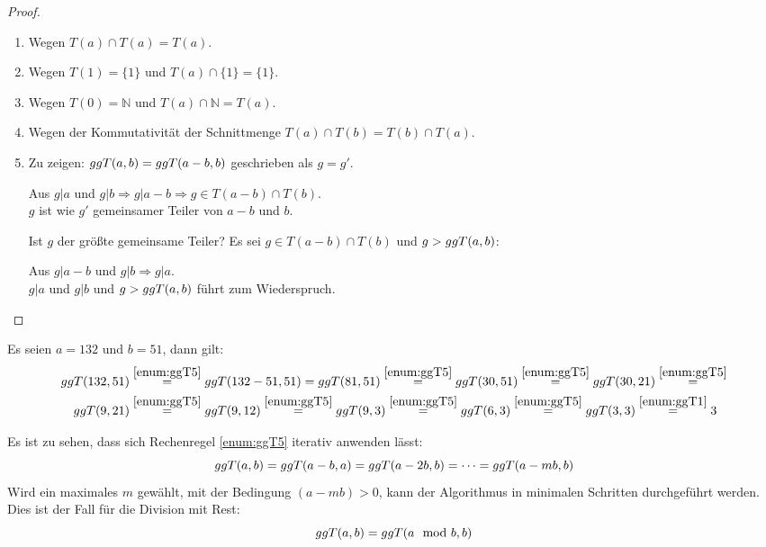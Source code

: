 \begin{proof}\mbox{}
  \begin{enumerate}
    \item Wegen $T(a) \cap T(a) = T(a)$.
    \item Wegen $T(1) = \{1\}$ und $T(a) \cap \{1\} = \{1\}$.
    \item Wegen $T(0) = \mathbb{N}$ und $T(a) \cap \mathbb{N} = T(a)$.
    \item Wegen der Kommutativität der Schnittmenge $T(a) \cap T(b) = T(b)\cap T(a)$.\newpage
    \item Zu zeigen: $ggT(a,b) = ggT(a - b,b)$ geschrieben als $g = g'$.
          \begin{center}
            Aus $ g|a$ und $g|b \Rightarrow g|a-b \Rightarrow g \in T(a-b) \cap T(b)$.\\
            $g$ ist wie $g'$ gemeinsamer Teiler von $a-b$ und $b$.
          \end{center}
          Ist $g$ der größte gemeinsame Teiler?
          Es sei $g \in T(a-b) \cap T(b)$ und $g > ggT(a,b)$:
          \begin{center}
            Aus $g|a-b$ und $g|b \Rightarrow g|a$.\\
            $g|a$ und $g|b$ und $g > ggT(a,b)$ führt zum Wiederspruch.
          \end{center}
  \end{enumerate}
\end{proof}

\begin{example}
  Es seien $a=132$ und $b=51$, dann gilt:
  \begin{align*}
    ggT(132,51) & \stackrel{\ref{enum:ggT5}}{=} ggT(132 - 51,51) =
    ggT(81,51) \stackrel{\ref{enum:ggT5}}{=} ggT(30,51) \stackrel{\ref{enum:ggT5}}{=}
    ggT(30,21) \stackrel{\ref{enum:ggT5}}{=}                                        \\
    ggT(9,21)   & \stackrel{\ref{enum:ggT5}}{=} ggT(9,12) \stackrel{\ref{enum:ggT5}}{=}
    ggT(9,3) \stackrel{\ref{enum:ggT5}}{=} ggT(6,3) \stackrel{\ref{enum:ggT5}}{=}
    ggT(3,3) \stackrel{\ref{enum:ggT1}}{=} 3
  \end{align*}
\end{example}

\noindent
Es ist zu sehen, dass sich Rechenregel \ref{enum:ggT5} iterativ anwenden lässt:
\begin{equation*}
  ggT(a,b) = ggT(a-b,a) = ggT(a-2b,b) = \dots = ggT(a-mb,b)
\end{equation*}
Wird ein maximales $m$ gewählt, mit der Bedingung $(a-mb) > 0$, kann der Algorithmus
in minimalen Schritten durchgeführt werden. Dies ist der Fall für die Division mit Rest:
\begin{equation*}
  ggT(a,b) = ggT(a \mod{b},b)
\end{equation*}

